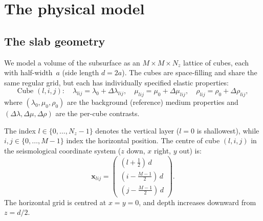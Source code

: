 \documentclass[11pt,a4paper]{article}
\newcommand{\D}{\Delta}
\begin{document}
\section{The physical model}
\label{sec:model}

\subsection{The slab geometry}

We model a volume of the subsurface as an $M \times M \times N_z$
lattice of cubes, each with half-width~$a$ (side length $d = 2a$).
The cubes are space-filling and share the same regular grid, but each
has individually specified elastic properties:
\begin{equation}
  \text{Cube } (l, i, j): \quad
  \lambda_{lij} = \lambda_0 + \D\lambda_{lij}, \quad
  \mu_{lij} = \mu_0 + \D\mu_{lij}, \quad
  \rho_{lij} = \rho_0 + \D\rho_{lij},
\end{equation}
where $(\lambda_0, \mu_0, \rho_0)$ are the background (reference)
medium properties and $(\D\lambda, \D\mu, \D\rho)$ are the per-cube
contrasts.

The index $l \in \{0, \ldots, N_z{-}1\}$ denotes the vertical layer
($l = 0$ is shallowest), while $i, j \in \{0, \ldots, M{-}1\}$ index
the horizontal position.  The centre of cube $(l, i, j)$ in the
seismological coordinate system ($z$ down, $x$ right, $y$ out) is:
\begin{equation}\label{eq:centres}
  \bm{x}_{lij} = \begin{pmatrix}
    (l + \tfrac{1}{2})\,d \\
    (i - \tfrac{M-1}{2})\,d \\
    (j - \tfrac{M-1}{2})\,d
  \end{pmatrix}.
\end{equation}
The horizontal grid is centred at $x = y = 0$, and depth increases
downward from $z = d/2$.
\end{document}
